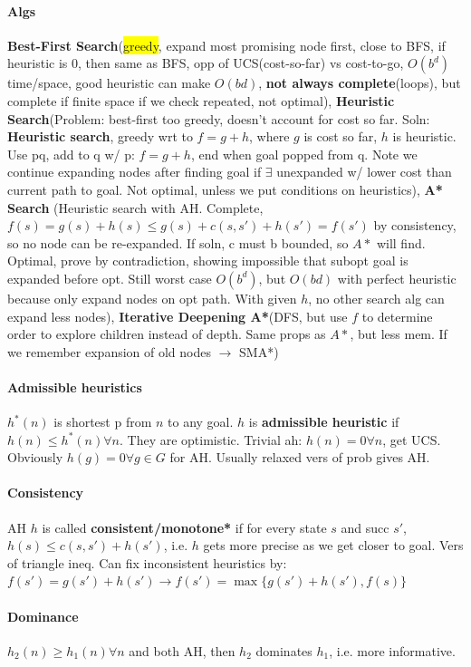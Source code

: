 \paragraph{Algs} \textbf{Best-First Search}(\colorbox{yellow}{greedy}, expand most
promising node first, close to BFS, if heuristic is 0, then same as
BFS, opp of UCS(cost-so-far) vs cost-to-go, $O(b^d)$ time/space, good
heuristic can make $O(bd)$, \textbf{not always complete}(loops), but
complete if finite space if we check repeated, not optimal), \textbf{Heuristic
  Search}(Problem: best-first 
too greedy, doesn't account for cost so far. Soln: \textbf{Heuristic
  search}, greedy wrt to $f = g+h$, where $g$ is cost so far, $h$ is
heuristic. Use pq, add to q w/ p: $f = g + h$, end when goal popped
from q. Note we continue expanding nodes after finding goal if
$\exists$ unexpanded w/ lower cost than current path to goal. Not
optimal, unless we put conditions on heuristics),
\textbf{A* Search} (Heuristic search with AH. Complete,
$f(s)=g(s)+h(s)\leq g(s)+c(s,s')+h(s')=f(s')$ by consistency, so no
node can be re-expanded. If soln, c must b bounded, so $A*$ will
find. Optimal, prove by contradiction, showing impossible that subopt
goal is expanded before opt. Still worst case $O(b^d)$, but $O(bd)$
with perfect heuristic because only expand nodes on opt path. With
given $h$, no other search alg can expand less nodes),
\textbf{Iterative Deepening A*}(DFS, but use $f$ to determine order to
explore children instead of depth. Same props as $A*$, but less
mem. If we remember expansion of old nodes $\to$ SMA*)
\paragraph{Admissible heuristics} $h^*(n)$ is shortest p from $n$ to
any goal. $h$ is \textbf{admissible heuristic} if $h(n) \leq h^*(n)
\forall n$. They are optimistic. Trivial ah: $h(n)=0 \forall n$, get
UCS. Obviously $h(g)=0 \forall g \in G$ for AH. Usually relaxed vers
of prob gives AH.
\paragraph{Consistency} AH $h$ is called \textbf{consistent/monotone*}
if for every state $s$ and succ $s'$, $h(s) \leq c(s,s') + h(s')$,
i.e. $h$ gets more precise as we get closer to goal. Vers of triangle
ineq. Can fix inconsistent heuristics by: $f(s')=g(s')+h(s') \to
f(s')=\max\{g(s')+h(s'),f(s)\}$
\paragraph{Dominance} $h_2(n) \geq h_1(n) \forall n$ and both AH, then
$h_2$ dominates $h_1$, i.e. more informative.
